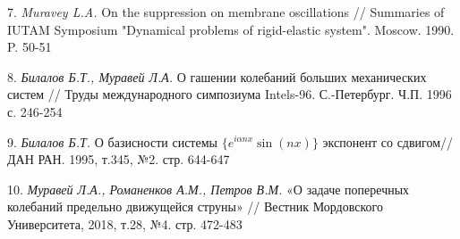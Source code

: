 7. {\it Muravey L.A.} On the suppression on membrane oscillations // Summaries of IUTAM Symposium "Dynamical problems of rigid-elastic system". Moscow. 1990. P. 50-51

8. {\it Билалов Б.Т., Муравей Л.А.} О гашении колебаний больших механических систем // Труды международного симпозиума Intels-96. С.-Петербург. Ч.П. 1996 с. 246-254 

9. {\it Билалов Б.Т.} О базисности системы $\{e^{i\alpha nx}\sin(nx)\}$ экспонент со сдвигом// ДАН РАН. 1995, т.345, №2. стр. 644-647

10. {\it Муравей Л.А., Романенков А.М., Петров В.М.} «О задаче поперечных колебаний предельно движущейся струны» // Вестник Мордовского Университета, 2018, т.28, №4. стр. 472-483
